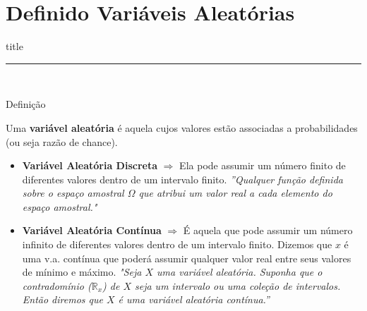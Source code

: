 \documentclass{beamer}
\begin{document}
\section{Definido Variáveis Aleatórias}
    \begin{frame}[plain]
        \vfill
      \centering
      \begin{beamercolorbox}[sep=8pt,center,shadow=true,rounded=true]{title}
        \insertsectionhead\par%
        \color{oxfordblue}\noindent\rule{10cm}{1pt} \\
        \LARGE{\faFileTextO}
      \end{beamercolorbox}
      \vfill
  \end{frame}


\begin{frame}{Definição}

Uma \textbf{variável aleatória} é aquela cujos valores estão associadas a probabilidades (ou seja razão de chance).

\begin{itemize}
    \item \textbf{Variável Aleatória Discreta} $\Rightarrow$ Ela pode assumir um número finito de diferentes valores dentro de um intervalo finito.
    \textit{''Qualquer função definida sobre o espaço amostral $\Omega$ que atribui um valor real a cada elemento do espaço amostral."}
    \item \textbf{Variável Aleatória Contínua} $\Rightarrow$ É aquela que pode assumir um número infinito de diferentes valores dentro de um intervalo finito. 
    Dizemos que $x$ é uma v.a. contínua que poderá assumir qualquer valor real entre seus valores de mínimo e máximo.
    \textit{"Seja $ X $ uma variável aleatória. Suponha que o contradomínio ($ \mathbb{R}_x $) de $ X $ seja um intervalo ou uma coleção de intervalos. Então diremos que $ X $ é uma variável aleatória contínua.''}%

\end{itemize}


\end{frame}
\end{document}
